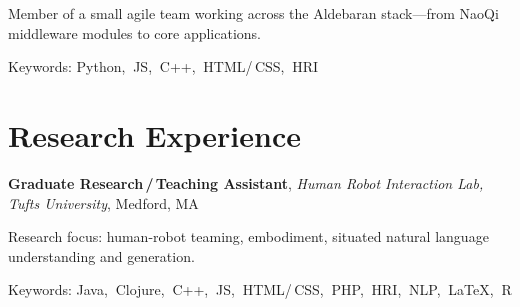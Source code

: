 \documentclass[10pt, letter]{article}
\newcommand{\years}[1]{\marginnote{\footnotesize #1}}
\newenvironment{desc*}{
  \begin{description}
    \setlength{\itemsep}{0.2pt}
    \setlength{\parskip}{-1pt}
    \setlength{\parsep}{0pt}
  }{
  \end{description}
}
\begin{document}
Member of a small agile team working across the Aldebaran stack---from NaoQi middleware modules to core applications.
\begin{desc*}
\item[\rm \color{redblue} Keywords:] Python,$\:$ JS,$\:$ C++,$\:$ HTML/\,CSS,$\:$ HRI\bigbreak
\end{desc*}

\section*{Research Experience}
\years{2012 - 2014} 
\textbf{Graduate Research\,/\,Teaching Assistant}, 
\textit{Human Robot Interaction Lab, Tufts University}, Medford, MA\bigskip

Research focus: human-robot teaming, embodiment, situated natural language understanding and generation. 
\begin{desc*}
\item[\rm \color{redblue} Keywords:] Java,$\:$ Clojure,$\:$ C++,$\:$
  JS,$\:$ HTML/\,CSS,$\:$ PHP,$\:$ HRI,$\:$ NLP,$\:$ \LaTeX,$\:$ R\bigbreak
\end{desc*}
\end{document}
